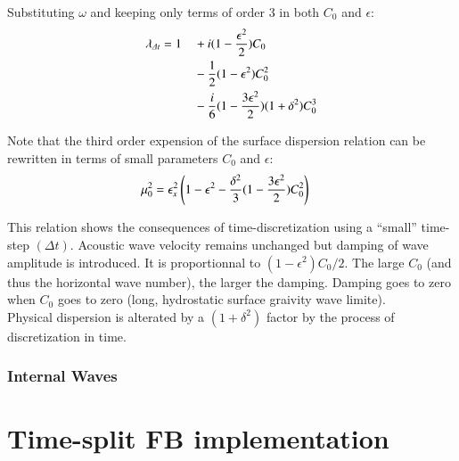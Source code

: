 \documentclass[a4paper,11pt]{article}
\begin{document}
Substituting $\omega$ and keeping only terms of order 3 in both $C_0$ and $\epsilon$:
   \begin{equation}
   \begin{split}
    \displaystyle
     &\lambda_{\Delta t}= 1 && +i(1-\frac{\epsilon^2}{2})C_0\\
     & &&-\frac{1}{2}(1-\epsilon^2)C_0^2\\
     & &&-\frac{i}{6}(1-\frac{3\epsilon^2}{2})
     (1+\delta^2)C_0^3
   \end{split}
 \end{equation}
\label{lambda_ana}

Note that the third order expension of the surface dispersion relation can be rewritten in terms of small parameters $C_0$ and $\epsilon$:
  \begin{equation}
    \begin{split}
      \displaystyle
      &\mu_0^2=\epsilon_x^2\left(1-\epsilon^2
      -\frac{\delta^2}{3}(1-\frac{3\epsilon^2}{2})C_0^2 \right)
    \end{split}
  \end{equation}
  \label{dispers_ana}

This relation shows the consequences of time-discretization using a ``small'' time-step $(\Delta t)$. Acoustic wave velocity remains unchanged but damping of wave amplitude is introduced. It is proportionnal to $(1-\epsilon^2)C_0/2$. The large $C_0$ (and thus the horizontal wave number), the larger the damping. Damping goes to zero when $C_0$ goes to zero (long, hydrostatic surface graivity wave limite).\\
Physical dispersion is alterated by a $(1+\delta^2)$ factor by the process of discretization in time.\\

\subsubsection{Internal Waves}



\newpage
\section{Time-split FB implementation}
\end{document}
